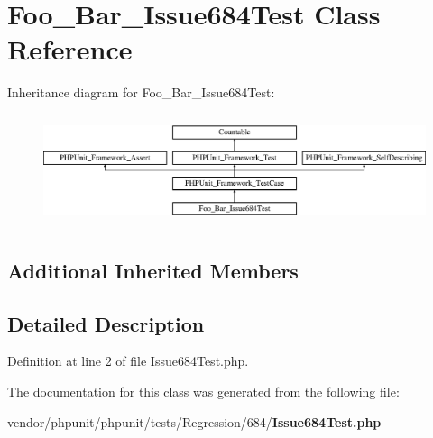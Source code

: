 \section{Foo\+\_\+\+Bar\+\_\+\+Issue684\+Test Class Reference}
\label{class_foo___bar___issue684_test}
Inheritance diagram for Foo\+\_\+\+Bar\+\_\+\+Issue684\+Test\+:\begin{figure}[H]
\begin{center}
\leavevmode
\includegraphics[height=3.303835cm]{class_foo___bar___issue684_test}
\end{center}
\end{figure}
\subsection*{Additional Inherited Members}


\subsection{Detailed Description}


Definition at line 2 of file Issue684\+Test.\+php.



The documentation for this class was generated from the following file\+:\begin{DoxyCompactItemize}
\item 
vendor/phpunit/phpunit/tests/\+Regression/684/{\bf Issue684\+Test.\+php}\end{DoxyCompactItemize}
